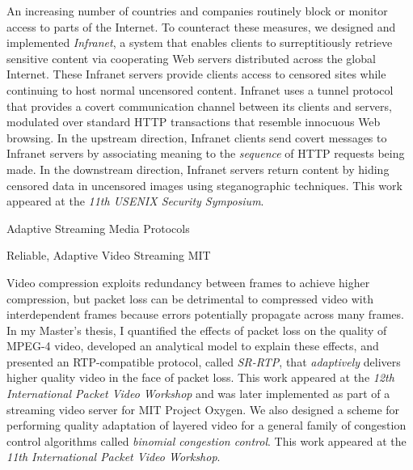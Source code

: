 \documentclass{article}
\begin{document}
\begin{cv}{}
    An increasing number of countries and companies routinely block or
    monitor access to parts of the Internet.  To counteract these
    measures, we designed and implemented {\em Infranet}, a system that
    enables clients to surreptitiously retrieve sensitive content via
    cooperating Web servers distributed across the global Internet.
    These Infranet servers provide clients access to censored sites
    while continuing to host normal uncensored content.  Infranet uses a
    tunnel protocol that provides a covert communication channel between
    its clients and servers, modulated over standard HTTP transactions
    that resemble innocuous Web browsing.  In the upstream direction,
    Infranet clients send covert messages to Infranet servers by
    associating meaning to the {\em sequence} of HTTP requests being
    made.  In the downstream direction, Infranet servers return content
    by hiding censored data in uncensored images using steganographic
    techniques.  This work appeared at the {\em 11th USENIX Security
    Symposium}. 


{\df Adaptive Streaming Media Protocols}

{\mf Reliable, Adaptive Video Streaming} \hfill MIT
\vspace*{-0.1in}

    Video compression exploits redundancy between frames to achieve
    higher compression, but packet loss can be detrimental to
    compressed video with interdependent frames because errors
    potentially propagate across many frames.  In my Master's thesis, I
    quantified the effects of packet loss on the quality of MPEG-4 video,
    developed an analytical model to explain these effects, and
    presented an RTP-compatible protocol, called {\em SR-RTP}, that {\em
    adaptively} delivers higher quality video in the face of packet
    loss.  This work appeared at the {\em 12th International Packet
    Video Workshop} and was later implemented as part of a
    streaming video server for MIT Project Oxygen.
    We also designed a scheme for performing quality adaptation of
    layered video for a general family of congestion control algorithms
    called {\em binomial congestion control}.
    This work appeared at the {\em 11th International Packet Video
    Workshop}.



\end{cv}
\end{document}
